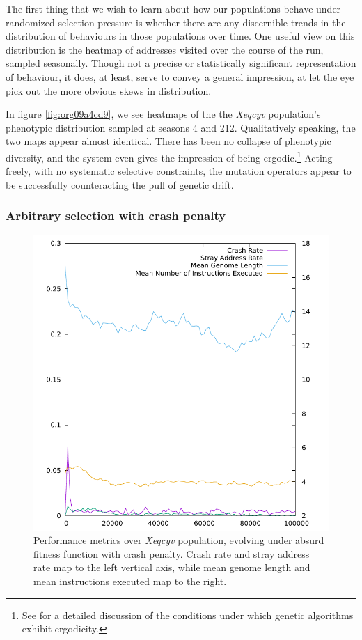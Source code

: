 \documentclass[12pt,glossary]{dalthesis}
\begin{document}
The first thing that we wish to learn about how our populations behave under
randomized selection pressure is whether there are any discernible 
trends in the distribution of behaviours in those populations over time. 
One useful view on this distribution is the heatmap of addresses visited over the
course of the run, sampled seasonally. Though not a precise or statistically
significant representation of behaviour, it does, at least, serve to convey a
general impression, at let the eye pick out the more obvious skews in distribution. 

In figure \ref{fig:org09a4cd9}, we see heatmaps of the the \emph{Xeqcyv} population's
phenotypic distribution sampled at seasons 4 and 212. Qualitatively speaking, the
two maps appear almost identical. There has been no collapse of phenotypic diversity,
and the system even gives the impression of being ergodic.\footnote{See \cite{schmitt01} for a detailed discussion of the conditions under which genetic algorithms exhibit ergodicity.} Acting freely, with
no systematic selective constraints, the mutation operators appear to be successfully
counteracting the pull of genetic drift. 


\subsubsection{Arbitrary selection with crash penalty}
\label{sec:orga14ec8a}
\label{orgb9f39ea}

\begin{figure}[htbp]
\centering
\includegraphics[width=.9\linewidth]{../images/plots/xeqcyv_kafka_performance.pdf}
\caption{\label{fig:org2803655}
Performance metrics over \emph{Xeqcyv} population, evolving under absurd fitness function with crash penalty. Crash rate and stray address rate map to the left vertical axis, while mean genome length and mean instructions executed map to the right.}
\end{figure}
\end{document}
